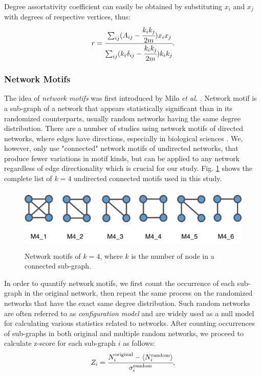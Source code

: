 \documentclass{article}
\begin{document}
Degree assortativity coefficient can easily be obtained by substituting $x_i$ and $x_j$ with degrees of respective vertices, thus:
	\begin{equation}
	 r =  \cfrac{\sum_{ij}(A_{ij} - \cfrac{k_i k_j}{2m})x_i x_j}{\sum_{ij}(k_i \delta_{ij} - \cfrac{k_i k_j}{2m}) k_i k_j}.
	\end{equation}

	\subsubsection{Network Motifs} 
The idea of \textit{network motifs} was first introduced by Milo \textit{et al.} \cite{Milo_motif}. Network motif is a sub-graph of a network that appears statistically significant than in its randomized counterparts, usually random networks having the same degree distribution. There are a number of studies using network motifs of directed networks, where edges have directions, especially in biological sciences \cite{Alon2007, MotifsInBrain}. We, however, only use "connected" network motifs of undirected networks, that produce fewer variations in motif kinds, but can be applied to any network regardless of edge directionality which is crucial for our study. Fig. \ref{motifs} shows the complete list of $k=4$ undirected connected motifs used in this study.

\begin{figure}[ht]
	\begin{center}
		\vspace{0.5cm}
		\includegraphics[clip,width=12cm,height = 3cm]{figs/motifs.png}
		\vspace{0.5cm}
		\caption{Network motifs of $k =4$, where $k$ is the number of node in a connected sub-graph.}
		\label{motifs}
	\end{center}
\end{figure}

In order to quantify network motifs, we first count the occurrence of each sub-graph in the original network, then repeat the same process on the randomized networks that have the exact same degree distribution. Such random networks are often referred to as \textit{configuration model} and are widely used as a null model for calculating various statistics related to networks. After counting occurrences of sub-graphs in both original and multiple random networks, we proceed to calculate z-score for each sub-graph $i$ as follows:
	\begin{equation}
	Z_i = \cfrac{N_i^{\text{original}} - \langle N_i^{\text{random}} \rangle }{\sigma_i^{\text{random}}},
	\end{equation}
\end{document}
